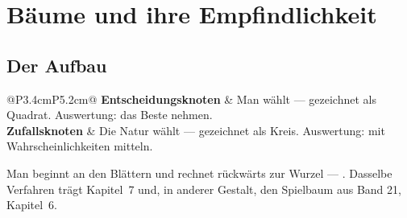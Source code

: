 \chapter{Bäume und ihre Empfindlichkeit}

\section{Der Aufbau}

\begin{merksatz}
\begin{center}
{\small
\renewcommand{\arraystretch}{1.55}
\begin{tabular}{@{}P{3.4cm}P{5.2cm}@{}}
\toprule
\textbf{Entscheidungs\-knoten} & Man wählt --- gezeichnet als Quadrat. Auswertung: das Beste nehmen.\\
\textbf{Zufallsknoten} & Die Natur wählt --- gezeichnet als Kreis. Auswertung: mit Wahrscheinlichkeiten mitteln.\\
\bottomrule
\end{tabular}}
\end{center}

Man beginnt an den Blättern und rechnet rückwärts zur Wurzel --- . Dasselbe Verfahren trägt Kapitel~7 und, in anderer Gestalt, den Spielbaum aus Band 21, Kapitel~6.

\begin{center}
\begin{minipage}{0.88\textwidth}
\end{minipage}
\end{center}
\end{merksatz}

